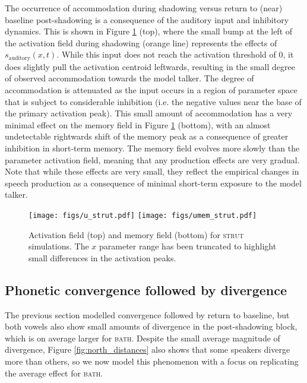 \documentclass[10pt,letterpaper]{article}
\begin{document}
The occurrence of accommodation during shadowing versus return to (near) baseline post-shadowing is a consequence of the auditory input and inhibitory dynamics.  This is shown in Figure \ref{fig:dnf-strut} (top), where the small bump at the left of the activation field during shadowing (orange line) represents the effects of $s_{\text{auditory}}(x,t)$. While this input does not reach the activation threshold of 0, it does slightly pull the activation centroid leftwards, resulting in the small degree of observed accommodation towards the model talker. The degree of accommodation is attenuated as the input occurs in a region of parameter space that is subject to considerable inhibition (i.e. the negative values near the base of the primary activation peak). This small amount of accommodation has a very minimal effect on the memory field in Figure \ref{fig:dnf-strut} (bottom), with an almost undetectable rightwards shift of the memory peak as a consequence of greater inhibition in short-term memory. The memory field evolves more slowly than the parameter activation field, meaning that any production effects are very gradual. Note that while these effects are very small, they reflect the empirical changes in speech production as a consequence of minimal short-term exposure to the model talker.


\begin{figure}
\centering
\texttt{[image: figs/u\_strut.pdf]}
\texttt{[image: figs/umem\_strut.pdf]}
\caption{Activation field (top) and memory field (bottom) for \textsc{strut} simulations. The $x$ parameter range has been truncated to highlight small differences in the activation peaks.}
\label{fig:dnf-strut}
\end{figure}




\subsection{Phonetic convergence followed by divergence}

The previous section modelled convergence followed by return to baseline, but both vowels also show small amounts of divergence in the post-shadowing block, which is on average larger for \textsc{bath}. Despite the small average magnitude of divergence, Figure \ref{fig:north_distances} also shows that some speakers diverge more than others, so we now model this phenomenon with a focus on replicating the average effect for \textsc{bath}.
\end{document}
